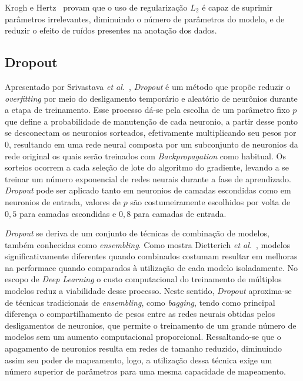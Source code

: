 Krogh e Hertz~\cite{krogh92} provam que o uso de regularização $L_{2}$ é capaz de suprimir parâmetros irrelevantes, diminuindo o número de parâmetros do modelo, e de reduzir o efeito de ruídos presentes na anotação dos dados.

\subsection{Dropout}

Apresentado por Srivastava \textit{et al.}~\cite{srivastava14}, \textit{Dropout} é um método que propõe reduzir o \textit{overfitting} por meio do desligamento temporário e aleatório de neurônios durante a etapa de treinamento. Esse processo dá-se pela escolha de um parâmetro fixo $p$ que define a probabilidade de manutenção de cada neuronio, a partir desse ponto se desconectam os neuronios sorteados, efetivamente multiplicando seu pesos por 0, resultando em uma rede neural composta por um subconjunto de neuronios da rede original os quais serão treinados com \textit{Backpropagation} como habitual. Os sorteios ocorrem a cada seleção de lote do algoritmo do gradiente, levando a se treinar um número exponencial de redes neurais durante a fase de aprendizado. \textit{Dropout} pode ser aplicado tanto em neuronios de camadas escondidas como em neuronios de entrada, valores de $p$ são costumeiramente escolhidos por volta de $0,5$ para camadas escondidas e $0,8$ para camadas de entrada.

\textit{Dropout} se deriva de um conjunto de técnicas de combinação de modelos, também conhecidas como \textit{ensembling}. Como mostra Dietterich \textit{et al.}~\cite{dietterich00}, modelos significativamente diferentes quando combinados costumam resultar em melhoras na performace quando comparados à utilização de cada modelo isoladamente. No escopo de \textit{Deep Learning} o custo computacional do treinamento de múltiplos modelos reduz a viabilidade desse processo. Neste sentido, \textit{Dropout} aproxima-se de técnicas tradicionais de \textit{ensembling}, como \textit{bagging}, tendo como principal diferença o compartilhamento de pesos entre as redes neurais obtidas pelos desligamentos de neuronios, que permite o treinamento de um grande número de modelos sem um aumento computacional proporcional. Ressaltando-se que o apagamento de neuronios resulta em redes de tamanho reduzido, diminuindo assim seu poder de mapeamento, logo, a utilização dessa técnica exige um número superior de parâmetros para uma mesma capacidade de mapeamento.

